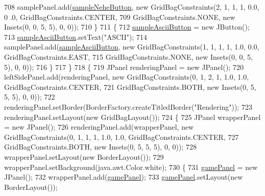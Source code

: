 \begin{DoxyCode}
708                 samplePanel.add(\mbox{\hyperlink{classorg_1_1newdawn_1_1slick_1_1tools_1_1hiero_1_1_hiero_a52c15e38f26347d1de7fc7ae6c87804f}{sampleNeheButton}}, \textcolor{keyword}{new} GridBagConstraints(2, 1, 1, 1, 0.0, 0
      .0, GridBagConstraints.CENTER,
709                     GridBagConstraints.NONE, \textcolor{keyword}{new} Insets(0, 0, 5, 5), 0, 0));
710             \}
711             \{
712                 \mbox{\hyperlink{classorg_1_1newdawn_1_1slick_1_1tools_1_1hiero_1_1_hiero_ac1e290018d3b30ebf449fa59c44f0b65}{sampleAsciiButton}} = \textcolor{keyword}{new} JButton();
713                 \mbox{\hyperlink{classorg_1_1newdawn_1_1slick_1_1tools_1_1hiero_1_1_hiero_ac1e290018d3b30ebf449fa59c44f0b65}{sampleAsciiButton}}.setText(\textcolor{stringliteral}{"ASCII"});
714                 samplePanel.add(\mbox{\hyperlink{classorg_1_1newdawn_1_1slick_1_1tools_1_1hiero_1_1_hiero_ac1e290018d3b30ebf449fa59c44f0b65}{sampleAsciiButton}}, \textcolor{keyword}{new} GridBagConstraints(1, 1, 1, 1, 1.0,
       0.0, GridBagConstraints.EAST,
715                     GridBagConstraints.NONE, \textcolor{keyword}{new} Insets(0, 0, 5, 5), 0, 0));
716             \}
717         \}
718         \{
719             JPanel renderingPanel = \textcolor{keyword}{new} JPanel();
720             leftSidePanel.add(renderingPanel, \textcolor{keyword}{new} GridBagConstraints(0, 1, 2, 1, 1.0, 1.0, 
      GridBagConstraints.CENTER,
721                 GridBagConstraints.BOTH, \textcolor{keyword}{new} Insets(0, 5, 5, 5), 0, 0));
722             renderingPanel.setBorder(BorderFactory.createTitledBorder(\textcolor{stringliteral}{"Rendering"}));
723             renderingPanel.setLayout(\textcolor{keyword}{new} GridBagLayout());
724             \{
725                 JPanel wrapperPanel = \textcolor{keyword}{new} JPanel();
726                 renderingPanel.add(wrapperPanel, \textcolor{keyword}{new} GridBagConstraints(0, 1, 1, 1, 1.0, 1.0, 
      GridBagConstraints.CENTER,
727                     GridBagConstraints.BOTH, \textcolor{keyword}{new} Insets(0, 5, 5, 5), 0, 0));
728                 wrapperPanel.setLayout(\textcolor{keyword}{new} BorderLayout());
729                 wrapperPanel.setBackground(java.awt.Color.white);
730                 \{
731                     \mbox{\hyperlink{classorg_1_1newdawn_1_1slick_1_1tools_1_1hiero_1_1_hiero_a2ce748cacd6def18f0e72fc5a139518c}{gamePanel}} = \textcolor{keyword}{new} JPanel();
732                     wrapperPanel.add(\mbox{\hyperlink{classorg_1_1newdawn_1_1slick_1_1tools_1_1hiero_1_1_hiero_a2ce748cacd6def18f0e72fc5a139518c}{gamePanel}});
733                     \mbox{\hyperlink{classorg_1_1newdawn_1_1slick_1_1tools_1_1hiero_1_1_hiero_a2ce748cacd6def18f0e72fc5a139518c}{gamePanel}}.setLayout(\textcolor{keyword}{new} BorderLayout());

\end{DoxyCode}
